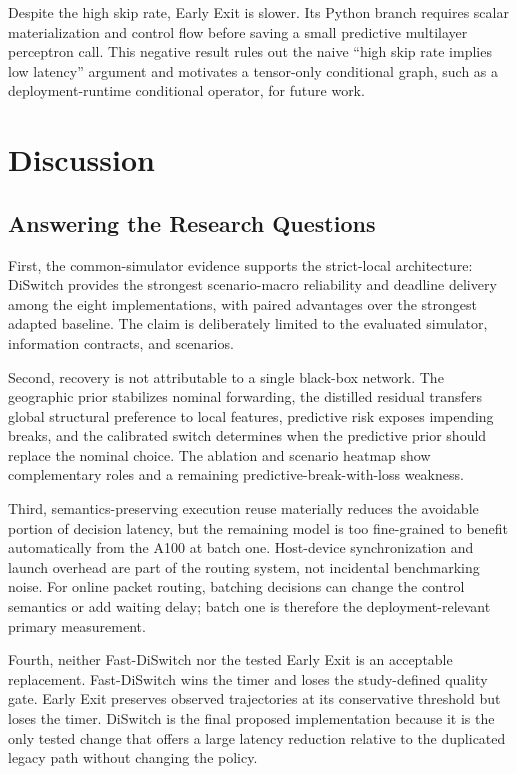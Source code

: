 \documentclass[drones,article,submit,moreauthors]{Definitions/mdpi}
\newcommand{\DS}{DiSwitch}\newcommand{\FastDS}{Fast-DiSwitch}
\begin{document}
Despite the high skip rate, Early Exit is slower. Its Python branch requires scalar materialization and control flow before saving a small predictive multilayer perceptron call. This negative result rules out the naive ``high skip rate implies low latency'' argument and motivates a tensor-only conditional graph, such as a deployment-runtime conditional operator, for future work.

\section{Discussion}

\subsection{Answering the Research Questions}

First, the common-simulator evidence supports the strict-local architecture: \DS{} provides the strongest scenario-macro reliability and deadline delivery among the eight implementations, with paired advantages over the strongest adapted baseline. The claim is deliberately limited to the evaluated simulator, information contracts, and scenarios.

Second, recovery is not attributable to a single black-box network. The geographic prior stabilizes nominal forwarding, the distilled residual transfers global structural preference to local features, predictive risk exposes impending breaks, and the calibrated switch determines when the predictive prior should replace the nominal choice. The ablation and scenario heatmap show complementary roles and a remaining predictive-break-with-loss weakness.

Third, semantics-preserving execution reuse materially reduces the avoidable portion of decision latency, but the remaining model is too fine-grained to benefit automatically from the A100 at batch one. Host-device synchronization and launch overhead are part of the routing system, not incidental benchmarking noise. For online packet routing, batching decisions can change the control semantics or add waiting delay; batch one is therefore the deployment-relevant primary measurement.

Fourth, neither \FastDS{} nor the tested Early Exit is an acceptable replacement. \FastDS{} wins the timer and loses the study-defined quality gate. Early Exit preserves observed trajectories at its conservative threshold but loses the timer. \DS{} is the final proposed implementation because it is the only tested change that offers a large latency reduction relative to the duplicated legacy path without changing the policy.
\end{document}
